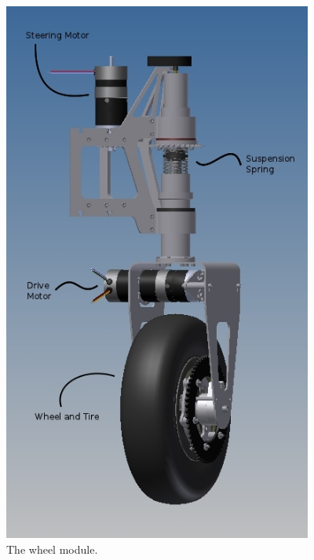 \documentclass[12pt]{article}
\begin{document}
\begin{figure}[htbp]
\centering
\includegraphics[width=4in]{../assets/wheelmodule.jpg}
\caption{The wheel module.}
\label{fig_bot_wheel}
\end{figure}
\end{document}
